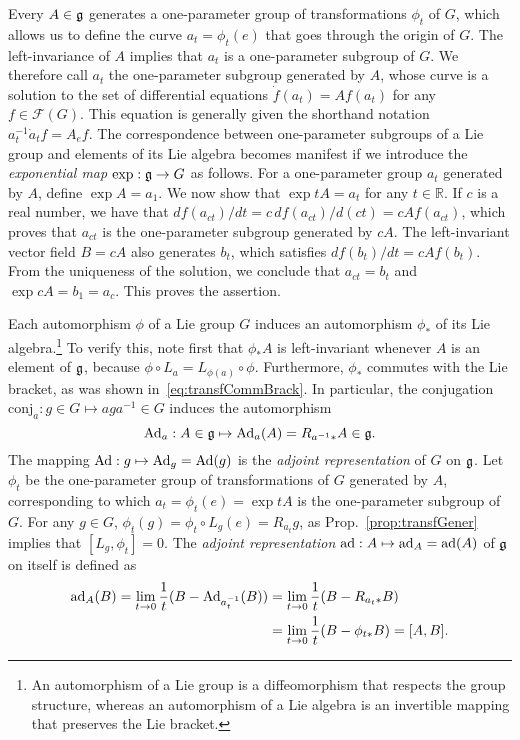 \documentclass[
final,
11pt,
a4paper,
DIV=11,
headinclude=true,
footinclude=false,
bibliography=totoc,
twoside=true,  %
BCOR=5mm
]{scrbook}
\begin{document}
Every $A \in \mathfrak{g}$ generates a one-parameter group of 
transformations $\phi_t$ of $G$, which allows us to define the 
curve $a_t = \phi_t(e)$ that goes through the origin of $G$. The 
left-invariance of $A$ implies that $a_t$ is a one-parameter 
subgroup of $G$. We therefore call $a_t$ the one-parameter 
subgroup generated by $A$, whose curve is a solution to the set 
of differential equations $\dot{f}(a_t) = Af(a_t)$ for any $f \in 
\mathscr{F}(G)$. This equation is generally given the shorthand 
notation $a^{-1}_t \dot{a}_t f = A_e f$. The correspondence 
between one-parameter subgroups of a Lie group and elements of 
its Lie algebra becomes manifest if we introduce the 
\emph{exponential map} $\exp : \mathfrak{g} \to G$ as follows. For 
a one-parameter group $a_t$ generated by $A$, define $\exp 
A = a_1$.  We now show that $\exp tA = a_t$ for any $t \in 
\mathds{R}$.  If $c$ is a real number, we have that 
$df(a_{ct})/dt = c\, df(a_{ct})/d(ct) = cAf(a_{ct})$, which 
proves that $a_{ct}$ is the one-parameter subgroup generated by 
$cA$. The left-invariant vector field $B = cA$ also generates 
$b_t$, which satisfies $df(b_{t})/dt = cAf(b_t)$.  From the 
uniqueness of the solution, we conclude that $a_{ct} = b_t$ and 
$\exp cA = b_1 = a_c$. This proves the assertion. 

Each automorphism $\phi$ of a Lie group $G$ induces an 
automorphism $\phi_*$ of its Lie algebra.\footnote{%
  An automorphism of a Lie group is a diffeomorphism that 
  respects the group structure, whereas an automorphism of a Lie 
  algebra is an invertible mapping that preserves the Lie 
  bracket.}
To verify this, note first that $\phi_* A$ is left-invariant 
whenever $A$ is an element of $\mathfrak{g}$, because $\phi \circ L_a 
= L_{\phi(a)} \circ \phi$.  Furthermore, $\phi_*$ commutes with 
the Lie bracket, as was shown in~\eqref{eq:transfCommBrack}. In 
particular, the conjugation $\mathrm{conj}_a : g \in G \mapsto 
a g a^{-1} \in G$ induces the automorphism
\begin{equation*}
  \operatorname{Ad}_a : A \in \mathfrak{g} \mapsto \operatorname{Ad}_a(A) = R_{a^{-1}*} A \in 
  \mathfrak{g}.
\end{equation*}
The mapping $\operatorname{Ad} : g \mapsto \operatorname{Ad}_g = \operatorname{Ad}(g)$ is the \emph{adjoint 
  representation} of $G$ on $\mathfrak{g}$. Let $\phi_t$ be the 
one-parameter group of transformations of $G$ generated by $A$, 
corresponding to which $a_t = \phi_t(e) = \exp tA$ is the 
one-parameter subgroup of $G$. For any $g \in G$, $\phi_t(g) = 
\phi_t \circ L_g (e) = R_{a_t} g$, as 
Prop.~\ref{prop:transfGener} implies that $[L_g, \phi_t] = 0$.  
The \emph{adjoint representation} $\operatorname{ad} : A \mapsto \operatorname{ad}_A = 
\operatorname{ad}(A)$ of $\mathfrak{g}$ on itself is defined as
\begin{equation*}
\begin{split}
  \operatorname{ad}_A (B) = \lim_{t \to 0} \frac{1}{t} (B - \operatorname{Ad}_{a^{-1}_t} (B))
    &= \lim_{t \to 0} \frac{1}{t} (B - R_{a_t*} B)
    \\
    &= \lim_{t \to 0} \frac{1}{t} (B - \phi_{t*} B) = [A,B].
\end{split}
\end{equation*}
\end{document}
